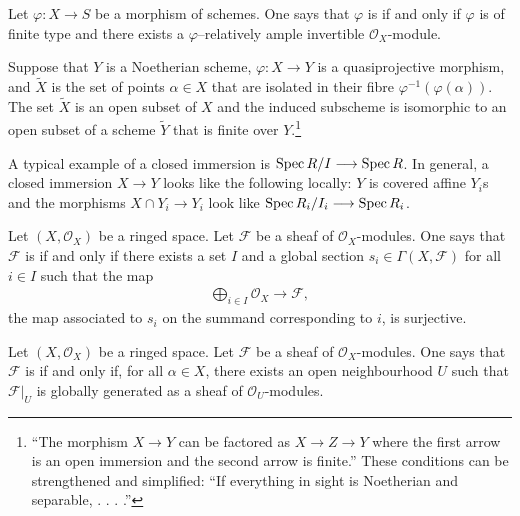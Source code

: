 \documentclass [11 pt, oneside] {article}
\begin{document}
\begin{definition}\label{}\text{}
Let $\varphi : X\longrightarrow S$ be a morphism of schemes. One says that $\varphi$ is  if and only if $\varphi$ is of finite type and there exists a $\varphi$--relatively ample invertible $\mathscr{O}_X$-module.
\end{definition}

\begin{theorem}\label{mtdz}\text{}
Suppose that $Y$ is a Noetherian scheme, $\varphi: X\longrightarrow Y$ is a quasiprojective morphism, and $\tilde X$ is the set of points $\alpha\in X$ that are isolated in their fibre $\varphi^{-1}(\varphi(\alpha))$. The set $\tilde X$ is an open subset of $X$ and the induced subscheme is isomorphic to an open subset of a scheme $\tilde Y$ that is finite over $Y$.\footnote{``The morphism $X\longrightarrow Y$ can be factored as $X\longrightarrow Z\longrightarrow Y$ where the first arrow is an open immersion and the second arrow is finite.'' These conditions can be strengthened and simplified: ``If everything in sight is Noetherian and separable, . . . .''}
\end{theorem}

A typical example of a closed immersion is $\operatorname{Spec} R/I\longrightarrow \operatorname{Spec} R$. In general, a closed immersion $X\longrightarrow Y$ looks like the following locally: $Y$ is covered affine $Y_i$s and the morphisms $X\cap Y_i\longrightarrow Y_i$ look like $\operatorname{Spec} R_i/I_i \longrightarrow \operatorname{Spec} R_i$.

\begin{definition}\label{}\text{}
Let $(X,\mathscr{O}_X)$ be a ringed space. Let $\mathscr{F}$ be a sheaf of $\mathscr{O}_X$-modules. One says that $\mathscr{F}$ is  if and only if there exists a set $I$ and a global section $s_i\in \Gamma(X,\mathscr{F})$ for all $i\in I$ such that the map
\begin{align*}
	\bigoplus_{i\in I}\mathscr{O}_X \longrightarrow \mathscr{F},
\end{align*}
the map associated to $s_i$ on the summand corresponding to $i$, is surjective.
\end{definition}


\begin{definition}\label{}\text{}
Let $(X,\mathscr{O}_X)$ be a ringed space. Let $\mathscr{F}$ be a sheaf of $\mathscr{O}_X$-modules. One says that $\mathscr{F}$ is  if and only if, for all $\alpha\in X$, there exists an open neighbourhood $U$ such that $\mathscr{F}\big |_U$ is globally generated as a sheaf of $\mathscr{O}_U$-modules.
\end{definition}
\end{document}
